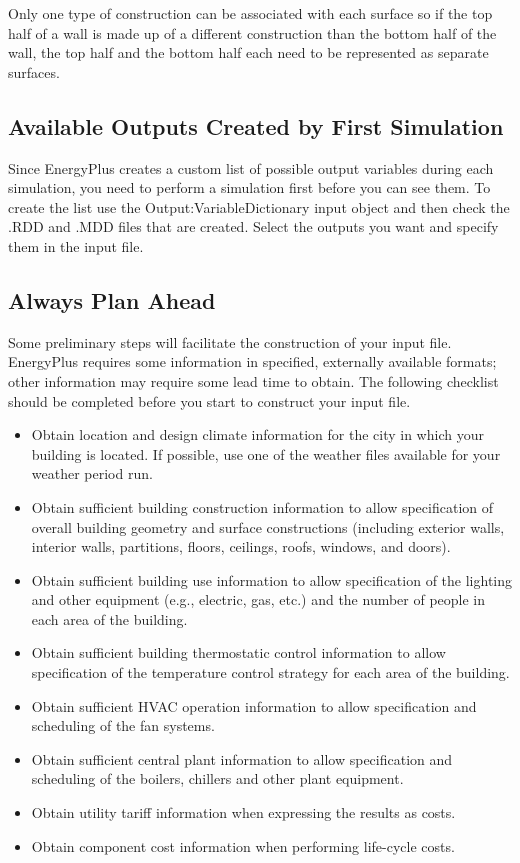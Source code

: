 Only one type of construction can be associated with each surface
so if the top half of a wall is made up of a different construction
than the bottom half of the wall, the top half and the bottom half
each need to be represented as separate surfaces.

\subsection*{Available Outputs Created by First Simulation}

Since EnergyPlus creates a custom list of possible output variables
during each simulation, you need to perform a simulation first before
you can see them. To create the list use the Output:VariableDictionary
input object and then check the .RDD and .MDD files that are created.
Select the outputs you want and specify them in the input file.

\subsection*{Always Plan Ahead}

Some preliminary steps will facilitate the construction of your input
file. EnergyPlus requires some information in specified, externally
available formats; other information may require some lead time to
obtain. The following checklist should be completed before you start
to construct your input file.
\begin{itemize}
\item Obtain location and design climate information for the city in which
your building is located. If possible, use one of the weather files
available for your weather period run.
\item Obtain sufficient building construction information to allow specification
of overall building geometry and surface constructions (including
exterior walls, interior walls, partitions, floors, ceilings, roofs,
windows, and doors).
\item Obtain sufficient building use information to allow specification
of the lighting and other equipment (e.g., electric, gas, etc.) and
the number of people in each area of the building.
\item Obtain sufficient building thermostatic control information to allow
specification of the temperature control strategy for each area of
the building.
\item Obtain sufficient HVAC operation information to allow specification
and scheduling of the fan systems.
\item Obtain sufficient central plant information to allow specification
and scheduling of the boilers, chillers and other plant equipment.
\item Obtain utility tariff information when expressing the results as costs.
\item Obtain component cost information when performing life-cycle costs.
\end{itemize}


